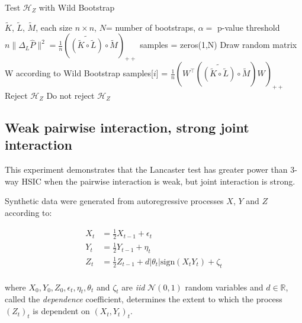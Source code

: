 \documentclass[]{article}
\begin{document}
\begin{algorithm}[tb]
   \caption{Test $\mathcal{H}_Z$ with Wild Bootstrap}
   \label{alg:Lancaster}
\begin{algorithmic}
    $\tilde{K}$, $\tilde{L}$, $\tilde{M}$, each size $n\times n$, $N$= number of bootstraps, $\alpha=$ p-value threshold
   \STATE $n\|\Delta_L\hat{P}\|^2 = \frac{1}{n}\left(\widetilde{\left( \tilde{K} \circ \tilde{L}\right) }\circ \tilde{M} \right)_{++}$
   \STATE samples = zeros(1,N)
   \STATE Draw random matrix W according to Wild Bootstrap
   \STATE samples[$i$] = $\frac{1}{n}\left(W^\intercal\left( \widetilde{\left( \tilde{K} \circ \tilde{L}\right) }\circ \tilde{M} \right)W\right) _{++}$
   \ENDFOR
   \STATE Reject $\mathcal{H}_Z$
   \ELSE
   \STATE Do not reject $\mathcal{H}_Z$
   \ENDIF
\end{algorithmic}
\end{algorithm}

\subsection{Weak pairwise interaction, strong joint interaction}\label{experiment1}

This experiment demonstrates that the Lancaster test has greater power than 3-way HSIC when the pairwise interaction is weak, but joint interaction is strong.


Synthetic data were generated from autoregressive processes $X$, $Y$ and $Z$ according to:

\begin{align*}
X_t &= \frac{1}{2}X_{t-1} + \epsilon_t\\
Y_t &= \frac{1}{2}Y_{t-1} + \eta_t\\
Z_t &= \frac{1}{2}Z_{t-1} + d |\theta_t|\text{sign}(X_t Y_t) + \zeta_t\\
\end{align*}

where $X_0, Y_0, Z_0, \epsilon_t, \eta_t, \theta_t$ and $\zeta_t$ are \emph{iid} $\mathcal{N}(0,1)$ random variables and $d\in\mathbb{R}$, called the \emph{dependence} coefficient, determines the extent to which the process $(Z_t)_t$ is dependent on $(X_t,Y_t)_t$.
\end{document}

